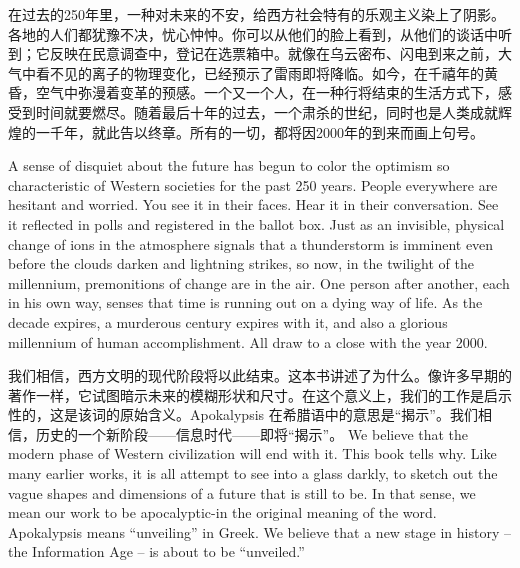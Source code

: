 \begin{paracol}{2}[]
\switchcolumn*
在过去的250年里，一种对未来的不安，给西方社会特有的乐观主义染上了阴影。各地的人们都犹豫不决，忧心忡忡。你可以从他们的脸上看到，从他们的谈话中听到；它反映在民意调查中，登记在选票箱中。就像在乌云密布、闪电到来之前，大气中看不见的离子的物理变化，已经预示了雷雨即将降临。如今，在千禧年的黄昏，空气中弥漫着变革的预感。一个又一个人，在一种行将结束的生活方式下，感受到时间就要燃尽。随着最后十年的过去，一个肃杀的世纪，同时也是人类成就辉煌的一千年，就此告以终章。所有的一切，都将因2000年的到来而画上句号。

\switchcolumn
A sense of disquiet about the future has begun to color the optimism so characteristic of Western societies for the past 250 years. People everywhere are hesitant and worried. You see it in their faces. Hear it in their conversation. See it reflected in polls and registered in the ballot box. Just as an invisible, physical change of ions in the atmosphere signals that a thunderstorm is imminent even before the clouds darken and lightning strikes, so now, in the twilight of the millennium, premonitions of change are in the air. One person after another, each in his own way, senses that time is running out on a dying way of life. As the decade expires, a murderous century expires with it, and also a glorious millennium of human accomplishment. All draw to a close with the year 2000. 

\switchcolumn*
我们相信，西方文明的现代阶段将以此结束。这本书讲述了为什么。像许多早期的著作一样，它试图暗示未来的模糊形状和尺寸。在这个意义上，我们的工作是启示性的，这是该词的原始含义。Apokalypsis 在希腊语中的意思是“揭示”。我们相信，历史的一个新阶段——信息时代——即将“揭示”。
\switchcolumn
We believe that the modern phase of Western civilization will end with it. This book tells why. Like many earlier works, it is all attempt to see into a glass darkly, to sketch out the vague shapes and dimensions of a future that is still to be. In that sense, we mean our work to be apocalyptic-in the original meaning of the word. Apokalypsis means “unveiling” in Greek. We believe that a new stage in history -- the Information Age -- is about to be “unveiled.” 
\end{paracol}

